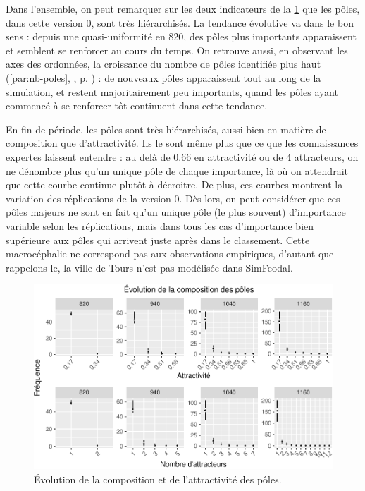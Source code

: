 \begin{mdframed}[backgroundcolor=gray!10,footnoteinside=false]
Dans l'ensemble, on peut remarquer sur les deux indicateurs de la \cref{fig:compo-poles-v0} que les pôles, dans cette version 0, sont très hiérarchisés.
La tendance \og évolutive va dans le bon sens :
depuis une quasi-uniformité en 820, des pôles plus importants apparaissent et semblent se renforcer au cours du temps.
On retrouve aussi, en observant les axes des ordonnées, la croissance du nombre de pôles identifiée plus haut (\ref{par:nb-poles}, , p. \pageref{par:nb-poles}) :
de nouveaux pôles apparaissent tout au long de la simulation, et restent majoritairement peu importants, quand les pôles ayant commencé à se renforcer tôt continuent dans cette tendance.

En fin de période, les pôles sont très hiérarchisés, aussi bien en matière de composition que d'attractivité.
Ils le sont même plus que ce que les connaissances expertes laissent entendre :
au delà de $0.66$ en attractivité ou de $4$ attracteurs, on ne dénombre plus qu'un unique pôle de chaque importance, là où on attendrait que cette courbe continue plutôt à décroitre.
De plus, ces courbes montrent la variation des réplications de la version 0.
Dès lors, on peut considérer que ces pôles majeurs ne sont en fait qu'un unique pôle (le plus souvent) d'importance variable selon les réplications, mais dans tous les cas d'importance bien supérieure aux pôles qui arrivent juste après dans le classement.
Cette macrocéphalie ne correspond pas aux observations empiriques, d'autant que rappelons-le, la ville de Tours n'est pas modélisée dans SimFeodal.


\end{mdframed}

\begin{figure}[H]
\captionsetup{width=\linewidth}
\includegraphics[width=\linewidth]{img/resultats/v0_compo_poles.pdf}
\caption{Évolution de la composition et de l'attractivité des pôles\protect\footnotemark{}.}
\label{fig:compo-poles-v0}
\end{figure}

